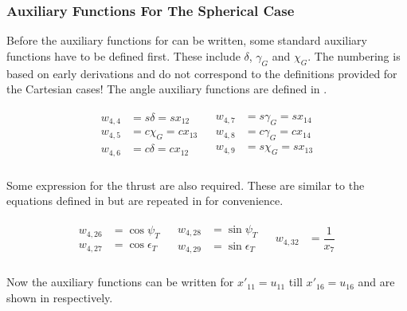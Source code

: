 \subsubsection{Auxiliary Functions For The Spherical Case}
\label{subsubsec:auxFspher}
Before the auxiliary functions for  can be written, some standard auxiliary functions have to be defined first. These include $\delta$, $\gamma_{G}$ and $\chi_{G}$. The numbering is based on early derivations and do not correspond to the definitions provided for the Cartesian cases! The angle auxiliary functions are defined in .

\begin{align} \label{eq:SpherAnglF}
\begin{split}
w_{4,4} &= s\delta = s x_{12}  \\
w_{4,5} &= c\chi_{G} = c x_{13} \\
w_{4,6} &= c\delta = c x_{12} \\
\end{split}
&
\begin{split}
w_{4,7} &= s\gamma_{G} = s x_{14} \\
w_{4,8} &= c\gamma_{G} = c x_{14} \\
w_{4,9} &= s\chi_{G} = s x_{13} \\
\end{split}
\end{align}

\noindent
Some expression for the thrust are also required. These are similar to the equations defined in  but are repeated in  for convenience. 

\begin{align} \label{eq:thrustAuxF}
\begin{split}
w_{4,26} &= \cos \psi_{T} \\
w_{4,27} &= \cos \epsilon_{T} \\
\end{split}
&
\begin{split}
w_{4,28} &= \sin \psi_{T} \\
w_{4,29} &= \sin \epsilon_{T} \\
\end{split}
&
\begin{split}
w_{4,32} &= \dfrac{1}{x_{7}} \\
\end{split}
\end{align}

\noindent
Now the auxiliary functions can be written for $x'_{11} = u_{11}$ till $x'_{16} = u_{16}$ and are shown in  respectively. 

